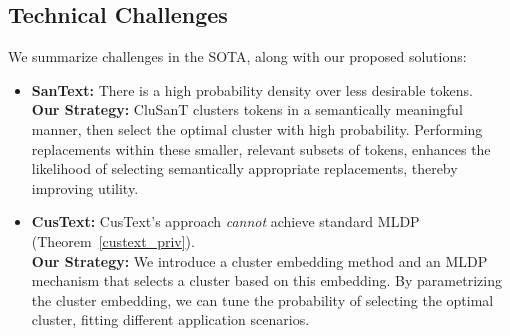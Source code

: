\documentclass[11pt]{article}
\newcommand{\clusant}{CluSanT\xspace}
\begin{document}
\subsection{Technical Challenges}
We summarize challenges in the SOTA,  along with our proposed solutions:

\begin{itemize}
\setlength\itemsep{0em}
    \item \textbf{SanText:} %
    There is a high probability density over less desirable tokens. \\
    \textbf{Our Strategy:} \clusant  clusters tokens in a semantically meaningful manner, then select the optimal cluster 
    with high probability.  
    Performing replacements within these smaller, relevant subsets of tokens, enhances the likelihood of selecting semantically appropriate replacements, thereby improving utility.

    \item \textbf{CusText:} 
    CusText's approach {\em cannot} achieve standard MLDP (Theorem~\ref{custext_priv}). \\
    \textbf{Our Strategy:} 
    We introduce a cluster embedding method and an MLDP mechanism that selects a cluster based on this embedding. By parametrizing the cluster embedding, we can tune the probability of selecting the optimal cluster, fitting different application scenarios.
    

\end{itemize}
\end{document}
